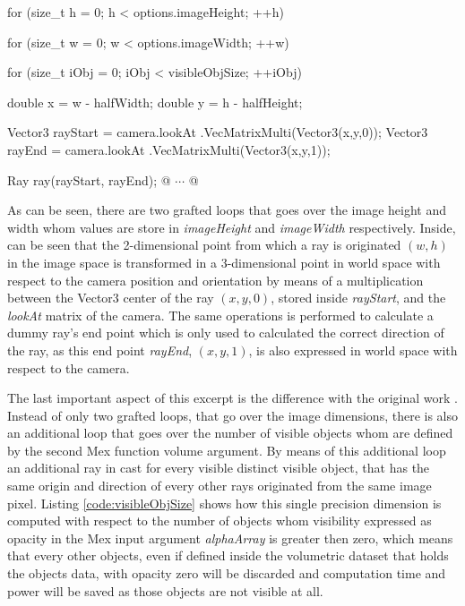 \documentclass[12pt,a4paper]{extarticle}
\newcommand{\linespace}{\vspace{8pt}}
\begin{document}
\begin{cpp}[caption={Main loop in which a ray is created for each output image pixel, and which origin point is transformed from screen space $(w,h)$ to world space coordinates $(x_{1},y_{1},z_{1})$.},label=code:rayloop]
for (size_t h = 0; h < options.imageHeight; ++h) {
	for (size_t w = 0; w < options.imageWidth; ++w) {
		for (size_t iObj = 0; iObj < visibleObjSize; ++iObj) {
			double x = w - halfWidth;
			double y = h - halfHeight;

			Vector3 rayStart = camera.lookAt
									.VecMatrixMulti(Vector3(x,y,0));
			Vector3 rayEnd = camera.lookAt
									.VecMatrixMulti(Vector3(x,y,1));

			Ray ray(rayStart, rayEnd);
			@ $\cdots$ @
		}
	}
}
			
\end{cpp}

As can be seen, there are two grafted loops that goes over the image height and width whom values are store in \textit{imageHeight} and \textit{imageWidth} respectively. Inside, can be seen that the 2-dimensional point from which a ray is originated $(w,h)$ in the image space is transformed in a 3-dimensional point in world space with respect to the camera position and orientation by means of a multiplication between the Vector3 center of the ray $(x,y,0)$, stored inside \textit{rayStart}, and the \textit{lookAt } matrix of the camera. The same operations is performed to calculate a dummy ray's end point which is only used to calculated the correct direction of the ray, as this end point \textit{rayEnd}, $(x,y,1)$, is also expressed in world space with respect to the camera.
\linespace

The last important aspect of this excerpt is the difference with the original work \cite{levoy_1990:5}. Instead of only two grafted loops, that go over the image dimensions, there is also an additional loop that goes over the number of visible objects whom are defined by the second Mex function volume argument. By means of this additional loop an additional ray in cast for every visible distinct visible object, that has the same origin and direction of every other rays originated from the same image pixel. Listing \ref{code:visibleObjSize} shows how this single precision dimension is computed with respect to the number of objects whom visibility expressed as opacity in the Mex input argument \textit{alphaArray} is greater then zero, which means that every other objects, even if defined inside the volumetric dataset that holds the objects data, with opacity zero will be discarded and computation time and power will be saved as those objects are not visible at all.
\end{document}

